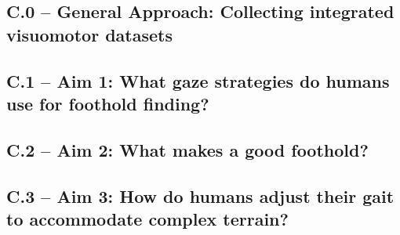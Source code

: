 


\subsection*{C.0 -- General Approach: Collecting integrated visuomotor datasets}





\subsection*{C.1 -- Aim 1: What gaze strategies do humans use for foothold finding?}




\subsection*{C.2 -- Aim 2: What makes a good foothold?}





\subsection*{C.3 -- Aim 3:  How do humans adjust their gait to accommodate complex terrain?}


